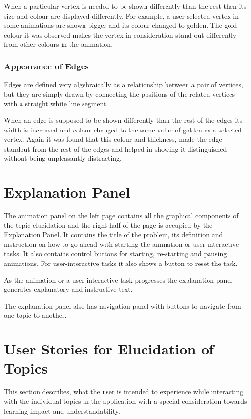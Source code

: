 When a particular vertex is needed to be shown differently than the rest then
its size and colour are displayed differently. For example, a user-selected
vertex in some animations are shown bigger and its colour changed to
golden. The gold colour it was observed makes the vertex in consideration
stand out differently from other colours in the animation.

\subsubsection{Appearance of Edges}
Edges are defined very algebraically as a relationship between a pair
of vertices, but they are simply drawn by connecting the positions of the related vertices with a straight white line segment.

When an edge is supposed to be shown differently than the rest of the edges its
width is increased and colour changed to the same value of golden as a selected vertex.
Again it was found that this colour and thickness, made the edge standout from the
rest of the edges and helped in showing it distinguished without being unpleasantly
distracting.

\section{Explanation Panel}
The animation panel on the left page contains all the graphical
components of the topic elucidation and the right half of the page is occupied by
the Explanation Panel. It contains the title of the problem,
its definition and instruction on how to go ahead with starting the animation
or user-interactive tasks.  It also contains control buttons for starting,
re-starting and pausing animations.  For user-interactive tasks it also shows a button to reset the task.

As the animation or a user-interactive task progresses the explanation panel
generates explanatory and instructive text.

The explanation panel also has navigation panel with buttons to navigate from
one topic to another.

\section{User Stories for Elucidation of Topics}

This section describes, what the user is intended to experience while
interacting with the individual topics in the application with a special
consideration towards learning impact and understandability.

